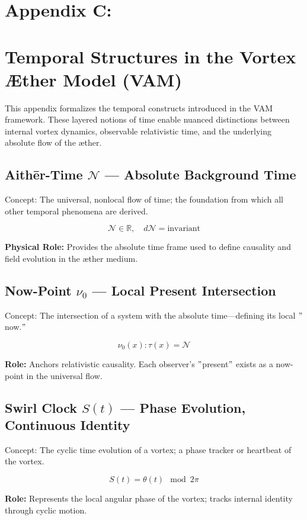 \section*{Appendix C:}\label{appendix:temporal_structures}
\section*{Temporal Structures in the Vortex Æther Model (VAM)}

This appendix formalizes the temporal constructs introduced in the VAM framework. These layered notions of time enable nuanced distinctions between internal vortex dynamics, observable relativistic time, and the underlying absolute flow of the æther.

\subsection*{Aithēr-Time $\mathcal{N}$ — Absolute Background Time}
Concept: The universal, nonlocal flow of time; the foundation from which all other temporal phenomena are derived.


\[
\mathcal{N} \in \mathbb{R}, \quad d\mathcal{N} = \text{invariant}
\]

\textbf{Physical Role:} Provides the absolute time frame used to define causality and field evolution in the æther medium.

\subsection*{Now-Point $\nu_0$ — Local Present Intersection}
Concept: The intersection of a system with the absolute time—defining its local \("\)now.\("\)


\[
\nu_0(x) : \tau(x) = \mathcal{N}
\]

\textbf{Role:} Anchors relativistic causality. Each observer's \("\)present\("\) exists as a now-point in the universal flow.

\subsection*{Swirl Clock $S(t)$ — Phase Evolution, Continuous Identity}
Concept: The cyclic time evolution of a vortex; a phase tracker or heartbeat of the vortex.


\[
S(t) = \theta(t) \mod 2\pi
\]

\textbf{Role:} Represents the local angular phase of the vortex; tracks internal identity through cyclic motion.

